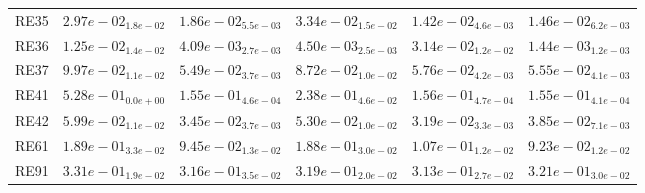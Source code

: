 \documentclass{article}
\begin{document}
\begin{table}
\begin{scriptsize}
\begin{tabular}{llllll}
RE35 & $  2.97e-02_{ 1.8e-02}$ & $  1.86e-02_{ 5.5e-03}$ & $  3.34e-02_{ 1.5e-02}$ & \cellcolor{gray95}$  1.42e-02_{ 4.6e-03}$ & \cellcolor{gray25}$  1.46e-02_{ 6.2e-03}$ \\
RE36 & $  1.25e-02_{ 1.4e-02}$ & \cellcolor{gray25}$  4.09e-03_{ 2.7e-03}$ & $  4.50e-03_{ 2.5e-03}$ & $  3.14e-02_{ 1.2e-02}$ & \cellcolor{gray95}$  1.44e-03_{ 1.2e-03}$ \\
RE37 & $  9.97e-02_{ 1.1e-02}$ & \cellcolor{gray95}$  5.49e-02_{ 3.7e-03}$ & $  8.72e-02_{ 1.0e-02}$ & $  5.76e-02_{ 4.2e-03}$ & \cellcolor{gray25}$  5.55e-02_{ 4.1e-03}$ \\
RE41 & $  5.28e-01_{ 0.0e+00}$ & \cellcolor{gray25}$  1.55e-01_{ 4.6e-04}$ & $  2.38e-01_{ 4.6e-02}$ & $  1.56e-01_{ 4.7e-04}$ & \cellcolor{gray95}$  1.55e-01_{ 4.1e-04}$ \\
RE42 & $  5.99e-02_{ 1.1e-02}$ & \cellcolor{gray25}$  3.45e-02_{ 3.7e-03}$ & $  5.30e-02_{ 1.0e-02}$ & \cellcolor{gray95}$  3.19e-02_{ 3.3e-03}$ & $  3.85e-02_{ 7.1e-03}$ \\
RE61 & $  1.89e-01_{ 3.3e-02}$ & \cellcolor{gray25}$  9.45e-02_{ 1.3e-02}$ & $  1.88e-01_{ 3.0e-02}$ & $  1.07e-01_{ 1.2e-02}$ & \cellcolor{gray95}$  9.23e-02_{ 1.2e-02}$ \\
RE91 & $  3.31e-01_{ 1.9e-02}$ & \cellcolor{gray25}$  3.16e-01_{ 3.5e-02}$ & $  3.19e-01_{ 2.0e-02}$ & \cellcolor{gray95}$  3.13e-01_{ 2.7e-02}$ & $  3.21e-01_{ 3.0e-02}$ \\
\hline
\end{tabular}
\end{scriptsize}
\end{table}
\end{document}
